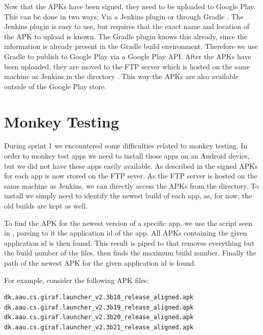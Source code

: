 Now that the APKs have been signed, they need to be uploaded to Google Play. This can be done in two ways: Via a Jenkins plugin \parencite{jenkins-play-plugin} or through Gradle \parencite{gradle-play-plugin}. The Jenkins plugin is easy to use, but requires that the exact name and location of the APK to upload is known. The Gradle plugin knows this already, since the information is already present in the Gradle build environment. Therefore we use Gradle to publish to Google Play via a Google Play API\@. After the APKs have been uploaded, they are moved to the FTP server which is hosted on the same machine as Jenkins in the directory . This way the APKs are also available outside of the Google Play store.

\section{Monkey Testing}\label{sec:monkey_testing_s2}
During sprint 1 we encountered some difficulties related to monkey testing. In order to monkey test apps we need to install those apps on an Android device, but we did not have these apps easily available. As described in  the signed APKs for each app is now stored on the FTP sever. As the FTP server is hosted on the same machine as Jenkins, we can directly access the APKs from the directory. To install we simply need to identify the newest build of each app, as, for now, the old builds are kept as well.

To find the APK for the newest version of a specific app, we use the script seen in , parsing to it the application id of the app. All APKs containing the given application id is then found. This result is piped to  that removes everything but the build number of the files.  \parencite{stackoverflow-max-number2012} then finds the maximum build number. Finally the path of the newest APK for the given application id is found.

For example, consider the following APK files:

\begin{lstlisting}[language=bash]
dk.aau.cs.giraf.launcher_v2.3b18_release_aligned.apk
dk.aau.cs.giraf.launcher_v2.3b19_release_aligned.apk
dk.aau.cs.giraf.launcher_v2.3b20_release_aligned.apk
dk.aau.cs.giraf.launcher_v2.3b21_release_aligned.apk
\end{lstlisting}

